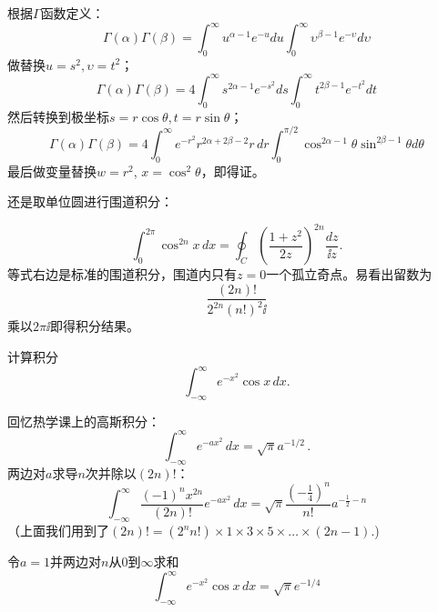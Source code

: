 \documentclass[CJK]{beamer}
\begin{document}
\begin{frame}
  \bch
  根据$\Gamma$函数定义：
  $$  \Gamma(\alpha)\Gamma(\beta) = \int_0^\infty u^{\alpha-1}e^{-u} du \int_0^\infty \upsilon^{\beta-1}e^{-\upsilon} d\upsilon    $$
  做替换$u=s^2, \upsilon = t^2$；
  $$  \Gamma(\alpha)\Gamma(\beta) = 4 \int_0^\infty s^{2\alpha-1}e^{-s^2} ds \int_0^\infty t^{2\beta-1}e^{-t^2} dt $$
  然后转换到极坐标$s = r\cos\theta, t = r\sin\theta$；
  $$ \Gamma(\alpha)\Gamma(\beta) = 4 \int_0^\infty  e^{-r^2}r^{2\alpha+2\beta-2}r\,dr \int_0^{\pi/2}\cos^{2\alpha-1}\theta \sin^{2\beta-1}\theta d\theta $$
  最后做变量替换$w = r^2$, $x = \cos^2\theta$，即得证。

  \ech
\end{frame}

\begin{frame}
  \bch
  还是取单位圆进行围道积分：


  
  $$ \int_0^{2\pi}\cos^{2n}x \, dx = \oint_C \left(\frac{1+z^2}{2z}\right)^{2n}\frac{dz}{\ii z}.$$
  等式右边是标准的围道积分，围道内只有$z=0$一个孤立奇点。易看出留数为
  $$\frac{(2n)!}{2^{2n}(n!)^2\ii}$$
  乘以$2\pi\ii$即得积分结果。

  

  
  \ech
\end{frame}



\begin{frame}
  \bch

  计算积分$$ \int_{-\infty}^\infty e^{-x^2}\cos x \, dx .$$

  
  \ech
\end{frame}


\begin{frame}
  \bch
  回忆热学课上的高斯积分：
  $$\int_{-\infty}^{\infty} e^{-ax^2}\,dx = \sqrt{\pi} a^{-1/2}\, .$$
  两边对$a$求导$n$次并除以$(2n)!$：
  $$\int_{-\infty}^{\infty} \frac{(-1)^nx^{2n}}{(2n)!} e^{-ax^2} \,dx= \sqrt{\pi}\frac{(-\frac{1}{4})^n}{n!} a^{-\frac{1}{2}-n}$$
  {\scriptsize （上面我们用到了$(2n)! = (2^n n!) \times 1\times 3\times 5\times\ldots \times(2n-1)$.)}
    
    令$a=1$并两边对$n$从$0$到$\infty$求和
  $$\int_{-\infty}^{\infty}  e^{-x^2}\cos x\,dx = \sqrt{\pi}e^{-1/4}$$
  \ech
\end{frame}
\end{document}
